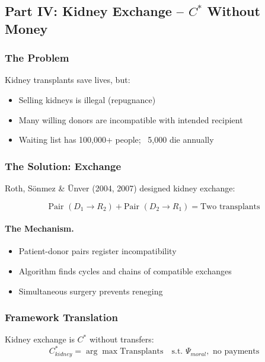 \subsection{Part IV: Kidney Exchange – $C^*$ Without Money}

\subsubsection{The Problem}

Kidney transplants save lives, but:
\begin{itemize}
    \item Selling kidneys is illegal (repugnance)
    \item Many willing donors are incompatible with intended recipient
    \item Waiting list has 100,000+ people; ~5,000 die annually
\end{itemize}

\subsubsection{The Solution: Exchange}

Roth, Sönmez \& Ünver (2004, 2007) designed kidney exchange:

\begin{equation}
\boxed{
\text{Pair } (D_1 \to R_2) + \text{Pair } (D_2 \to R_1) = \text{Two transplants}
}
\label{eq:kidney-exchange}
\end{equation}

\paragraph{The Mechanism.}
\begin{itemize}
    \item Patient-donor pairs register incompatibility
    \item Algorithm finds cycles and chains of compatible exchanges
    \item Simultaneous surgery prevents reneging
\end{itemize}

\subsubsection{Framework Translation}

Kidney exchange is $C^*$ without transfers:
\begin{equation}
C^*_{kidney} = \arg\max \text{Transplants} \quad \text{s.t. } \Psi_{moral}, \text{ no payments}
\end{equation}

